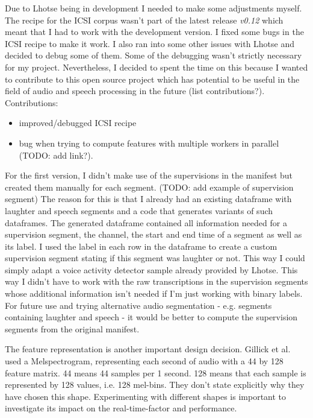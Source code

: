 \documentclass[bsc,frontabs,parskip,deptreport]{infthesis}
\begin{document}
Due to Lhotse being in development I needed to make some adjustments myself. The recipe for the ICSI corpus wasn't part of the latest release \textit{v0.12} which meant that I had to work with the development version. I fixed some bugs in the ICSI recipe to make it work. I also ran into some other issues with Lhotse and decided to debug some of them. Some of the debugging wasn't strictly necessary for my project. Nevertheless, I decided to spent the time on this because I wanted to contribute to this open source project which has potential to be useful in the field of audio and speech processing in the future (list contributions?).
Contributions: 
\begin{itemize}
    \item improved/debugged ICSI recipe 
    \item bug when trying to compute features with multiple workers in parallel (TODO: add link?).
\end{itemize}

For the first version, I didn't make use of the supervisions in the manifest but created them manually 
for each segment. (TODO: add example of supervision segment)
The reason for this is that I already had an existing dataframe with laughter and speech segments and a code that generates variants of such dataframes.
The generated dataframe contained all information needed for a supervision segment, the channel, the start and end time of a segment as well as its label. 
I used the label in each row in the dataframe to create a custom supervision segment stating if this segment was laughter or not. 
This way I could simply adapt a voice activity detector sample already provided by Lhotse. This way I didn't have to work with the raw transcriptions in the supervision segments whose additional information isn't needed if I'm just working with binary labels. 
For future use and trying alternative audio segmentation - e.g. segments containing laughter and speech - it would be better to compute the supervision segments from the original manifest.  


The feature representation is another important design decision. Gillick et al. \citep{gillick2021robust} used a Melspectrogram, representing each second of audio with a 44 by 128 feature matrix. 44 means 44 samples per 1 second. 128 means that each sample is represented by 128 values, i.e. 128 mel-bins. They don't state explicitly why they have chosen this shape. 
Experimenting with different shapes is important to investigate its impact on the real-time-factor and performance.  
\end{document}
